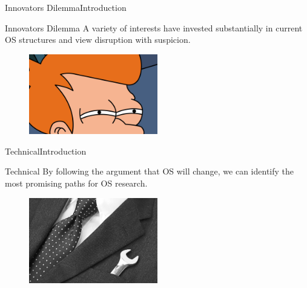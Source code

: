 \documentclass[10pt]{beamer}
\begin{document}
\begin{frame}{Innovators Dilemma}{Introduction}

  \begin{block}{Innovators Dilemma}
  A variety of interests have invested substantially in current OS structures
  and view disruption with suspicion.
  \end{block}

  \begin{figure}[ht]
    \hspace{-120pt}
    \includegraphics[width=0.5\textwidth, keepaspectratio=true]{images/frysuspicious.jpg}
  \end{figure}

\end{frame}

\begin{frame}{Technical}{Introduction}
  \begin{block}{Technical}
  By following the argument that OS will change, we can identify the
  most promising paths for OS research.
  \end{block}

  \begin{figure}[ht]
    \hspace{100pt}
    \includegraphics[width=0.5\textwidth, keepaspectratio=true]{images/technical.jpg}
  \end{figure}

\end{frame}
\end{document}
